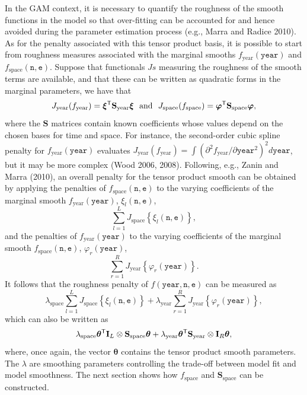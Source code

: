 \documentclass[10pt] {article}
\newcommand{\ts}{^{\sf T}}
\theoremstyle{definition}
\theoremstyle{plain}
\begin{document}
In the GAM context, it is necessary to quantify the roughness of the smooth functions in the model so that over-fitting can be accounted for and hence avoided during the parameter estimation process (e.g., Marra and Radice 2010). As for the penalty associated with this tensor product basis, it is possible to start from roughness measures associated with the marginal smooths $f_\text{year}(\texttt{year})$ and $f_\text{space}(\texttt{n},\texttt{e})$. Suppose that functionals $Js$ measuring the roughness of the smooth terms are available, and that these can be written as quadratic forms in the marginal parameters, we have that
$$
J_\text{year}(f_\text{year})=\bm\xi\ts\textbf{S}_\text{year}\bm\xi \ \ \text{and} \ \ J_\text{space}(f_\text{space})=\bm\varphi\ts\textbf{S}_\text{space}\bm\varphi,
$$
where the $\textbf{S}$ matrices contain known coefficients whose values depend on the chosen bases for time and space. For instance, the second-order cubic spline penalty for $f_\text{year}(\texttt{year})$ evaluates $J_\text{year}(f_\text{year})=\int\left( \partial^2 f_\text{year}/\partial \texttt{year}^2 \right)^2 d\texttt{year}$, but it may be more complex (Wood 2006, 2008). Following, e.g., Zanin and Marra (2010), an overall penalty for the tensor product smooth can be obtained by applying the penalties of $f_\text{space}(\texttt{n},\texttt{e})$ to the varying coefficients of the marginal smooth $f_\text{year}(\texttt{year})$, $\xi_l(\texttt{n},\texttt{e})$,
$$
\sum_{l=1}^L J_\text{space}\left\{  \xi_l(\texttt{n},\texttt{e}) \right\},
$$ 
and the penalties of $f_\text{year}(\texttt{year})$ to the varying coefficients of the marginal smooth $f_\text{space}(\texttt{n},\texttt{e})$, $\varphi_r(\texttt{year})$,  
$$
\sum_{r=1}^R J_\text{year}\left\{  \varphi_r(\texttt{year}) \right\}.
$$ 
It follows that the roughness penalty of $f(\texttt{year},\texttt{n},\texttt{e})$ can be measured as 
$$
\lambda_\text{space} \sum_{l=1}^L J_\text{space}\left\{  \xi_l(\texttt{n},\texttt{e}) \right\} + \lambda_\text{year} \sum_{r=1}^R J_\text{year}\left\{  \varphi_r(\texttt{year}) \right\},
$$
which can also be written as
$$
\lambda_\text{space} \bm\theta\ts \textbf{I}_L \otimes \textbf{S}_\text{space} \bm\theta + \lambda_\text{year} \bm\theta\ts \textbf{S}_\text{year} \otimes \textbf{I}_R  \bm\theta,
$$
where, once again, the vector $\bm\theta$ contains the tensor product smooth parameters. The $\lambda$ are smoothing parameters controlling the trade-off between model fit and model smoothness. The next section shows how $f_\text{space}$ and $\textbf{S}_\text{space}$ can be constructed.   
\end{document}

